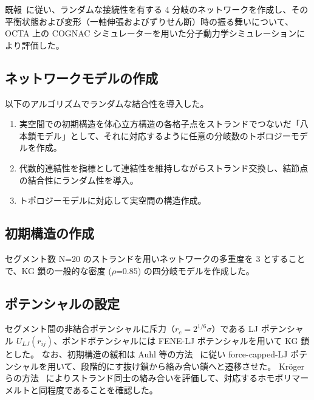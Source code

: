 \documentclass[uplatex,10pt,a4paper,twocolumn]{jsarticle}
\begin{document}

既報~\cite{sasaki}に従い、ランダムな接続性を有する 4 分岐のネットワークを作成し、その平衡状態および変形（一軸伸張およびずりせん断）時の振る舞いについて、OCTA 上の COGNAC シミュレーターを用いた分子動力学シミュレーションにより評価した。

\subsection{ネットワークモデルの作成}

以下のアルゴリズムでランダムな結合性を導入した。

\begin{enumerate}
\item
実空間での初期構造を体心立方構造の各格子点をストランドでつないだ「八本鎖モデル」として、それに対応するように任意の分岐数のトポロジーモデルを作成。
\item
代数的連結性を指標として連結性を維持しながらストランド交換し、結節点の結合性にランダム性を導入。
\item
トポロジーモデルに対応して実空間の構造作成。
\end{enumerate}


\subsection{初期構造の作成}
セグメント数 N=20 のストランドを用いネットワークの多重度を 3 とすることで、KG 鎖の一般的な密度 ($\rho$=0.85) の四分岐モデルを作成した。

\subsection{ポテンシャルの設定}
セグメント間の非結合ポテンシャルに斥力（$r_c = 2^{1/6}\sigma$）である LJ ポテンシャル $U_{LJ}(r_{ij})$、ボンドポテンシャルには FENE-LJ ポテンシャルを用いて KG 鎖とした。
なお、初期構造の緩和は Auhl 等の方法~\cite{Auhl} に従い force-capped-LJ ポテンシャルを用いて、段階的にす抜け鎖から絡み合い鎖へと遷移させた。
Kr\"{o}ger らの方法~\cite{Kroger} によりストランド同士の絡み合いを評価して、対応するホモポリマーメルトと同程度であることを確認した。
\end{document}
